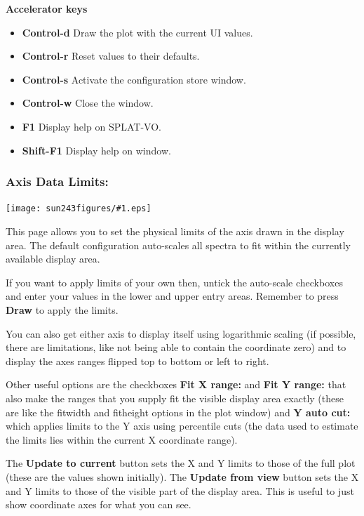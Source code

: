 \documentclass[twoside,11pt]{article}
\newcommand{\htmladdimg}[1]{}
\newcommand{\latexhtml}[2]{#1}
\renewcommand{\_}{\texttt{\symbol{95}}}
\newcommand{\SPLAT}{\textsf{SPLAT-VO}}
\newcommand{\mainfigure}[1]
{\begin{center}
 \latexhtml{\texttt{[image: sun243\_figures/\#1.eps]}}{\htmladdimg{#1.gif}}
 \end{center}
}
\newcommand{\labelitem}[1]{\textbf{#1}}
\newcommand{\subheading}[1]{\textbf{\large{#1}}}
\begin{document}
\subheading{Accelerator keys}

\begin{itemize}
\item \labelitem{Control-d} Draw the plot with the current UI values.
\item \labelitem{Control-r} Reset values to their defaults.
\item \labelitem{Control-s} Activate the configuration store window.
\item \labelitem{Control-w} Close the window.
\item \labelitem{F1} Display help on \SPLAT.     
\item \labelitem{Shift-F1} Display help on window.
\end{itemize}


\newpage
\subsubsection*{Axis Data Limits:}

\mainfigure{configurewindowlimits}

This page allows you to set the physical limits of the axis drawn in the
display area. The default configuration auto-scales all spectra to fit
within the currently available display area.

If you want to apply limits of your own then, untick the auto-scale checkboxes
and enter your values in the lower and upper entry areas. Remember to press
\labelitem{Draw} to apply the limits.

You can also get either axis to display itself using logarithmic scaling (if
possible, there are limitations, like not being able to contain the coordinate
zero) and to display the axes ranges flipped top to bottom or left to right.

Other useful options are the checkboxes \labelitem{Fit X range:} and
\labelitem{Fit Y range:} that also make the ranges that you supply
fit the visible display area exactly (these are like the fitwidth and
fitheight options in the plot window) and \labelitem{Y auto cut:} which
applies limits to the Y axis using percentile cuts (the data used to estimate
the limits lies within the current X coordinate range).

The \labelitem{Update to current} button sets the X and Y limits to
those of the full plot (these are the values shown initially).
The \labelitem{Update from view} button sets the X and Y limits to
those of the visible part of the display area. This is useful to just
show coordinate axes for what you can see.
\end{document}
